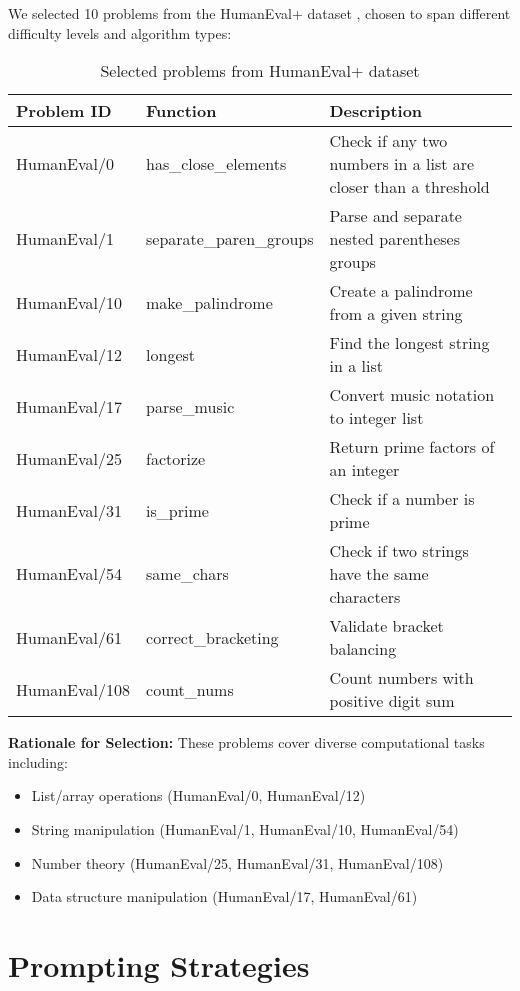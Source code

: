 \documentclass[11pt]{article}
\begin{document}
We selected 10 problems from the HumanEval+ dataset \cite{humanevalplus}, chosen to span different difficulty levels and algorithm types:

\begin{table}[h]
\centering
\begin{tabular}{llp{8cm}}
\toprule
\textbf{Problem ID} & \textbf{Function} & \textbf{Description} \\
\midrule
HumanEval/0 & has\_close\_elements & Check if any two numbers in a list are closer than a threshold \\
HumanEval/1 & separate\_paren\_groups & Parse and separate nested parentheses groups \\
HumanEval/10 & make\_palindrome & Create a palindrome from a given string \\
HumanEval/12 & longest & Find the longest string in a list \\
HumanEval/17 & parse\_music & Convert music notation to integer list \\
HumanEval/25 & factorize & Return prime factors of an integer \\
HumanEval/31 & is\_prime & Check if a number is prime \\
HumanEval/54 & same\_chars & Check if two strings have the same characters \\
HumanEval/61 & correct\_bracketing & Validate bracket balancing \\
HumanEval/108 & count\_nums & Count numbers with positive digit sum \\
\bottomrule
\end{tabular}
\caption{Selected problems from HumanEval+ dataset}
\label{tab:problems}
\end{table}

\textbf{Rationale for Selection:} These problems cover diverse computational tasks including:
\begin{itemize}
    \item List/array operations (HumanEval/0, HumanEval/12)
    \item String manipulation (HumanEval/1, HumanEval/10, HumanEval/54)
    \item Number theory (HumanEval/25, HumanEval/31, HumanEval/108)
    \item Data structure manipulation (HumanEval/17, HumanEval/61)
\end{itemize}

\section{Prompting Strategies}
\end{document}

